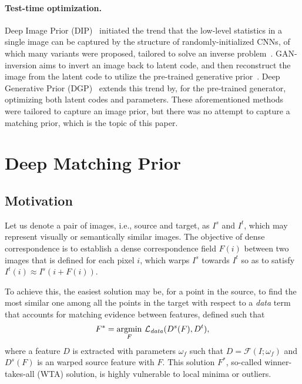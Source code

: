 \documentclass[10pt,twocolumn,letterpaper]{article}
\begin{document}
\paragraph{Test-time optimization.} 
Deep Image Prior (DIP)~\cite{ulyanov2018deep} initiated the trend that the low-level statistics in a single image can be captured by the structure of randomly-initialized CNNs, of which many variants were proposed, tailored to solve an inverse problem~\cite{dong2014learning,xu2014deep,shocher2018zero,kanazawa2018end}. 
GAN-inversion aims to invert an image back to latent code, and then reconstruct the image from the latent code to utilize the pre-trained generative prior~\cite{gansteerability,abdal2019image2stylegan,gu2020image,karras2019style,karras2020analyzing,zhu2020domain}. Deep Generative Prior (DGP)~\cite{pan2020dgp} extends this trend by, for the pre-trained generator, optimizing both latent codes and parameters. These aforementioned methods were tailored to capture an image prior, but there was no attempt to capture a matching prior, which is the topic of this paper. 


\section{Deep Matching Prior}\label{sec:3}
\subsection{Motivation}\label{sec:3_1}
Let us denote a pair of images, i.e., source and target, as $I^s$ and $I^t$, which may represent visually or semantically similar images. The objective of dense correspondence is to establish a dense correspondence field $F(i)$ between two images that is defined for each pixel $i$, which warps $I^s$ towards $I^t$ so as to satisfy $I^t(i) \approx I^s(i+F(i))$.

To achieve this, the easiest solution may be, for a point in the source, to find the most similar one among all the points in the target with respect to a \emph{data} term that accounts for matching evidence between features, defined such that
\begin{equation}
F^{*} = \underset{F}{\mathrm{argmin}}
\ \mathcal{L}_{\it{data}}(D^{s}(F),D^{t}),
\end{equation}
where a feature $D$ is extracted with parameters $\omega_f$ such that $D = \mathcal{F}(I;\omega_f)$ and $D^{s}(F)$ is an warped source feature with $F$. This solution $F^{*}$, so-called winner-takes-all (WTA) solution, is highly vulnerable to local minima or outliers.
 
\end{document}

